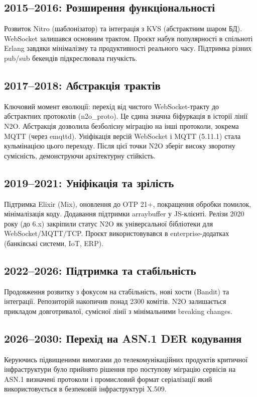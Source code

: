 \documentclass{article}
\begin{document}
\subsection{2015--2016: Розширення функціональності}
Розвиток Nitro (шаблонізатор) та інтеграція з KVS (абстрактним шаром БД). WebSocket
залишався основним трактом. Проєкт набув популярності в спільноті Erlang завдяки мінімалізму
та продуктивності реального часу. Підтримка різних pub/sub бекендів підкреслювала гнучкість.

\subsection{2017--2018: Абстракція трактів}
Ключовий момент еволюції: перехід від чистого WebSocket-тракту до абстрактних протоколів (n2o\_proto).
Це єдина значна біфуркація в історії лінії N2O. Абстракція дозволила безболісну міграцію на інші протоколи,
зокрема MQTT (через emqttd). Уніфікація версій WebSocket і MQTT (5.11.1) стала кульмінацією цього переходу.
Після цієї точки N2O зберіг високу зворотну сумісність, демонструючи архітектурну стійкість.

\subsection{2019--2021: Уніфікація та зрілість}
Підтримка Elixir (Mix), оновлення до OTP 21+, покращення обробки помилок, мінімалізація коду.
Додавання підтримки arraybuffer у JS-клієнті. Релізи 2020 року (до 6.x) закріпили статус N2O
як універсальної бібліотеки для WebSocket/MQTT/TCP. Проєкт використовувався в
enterprise-додатках (банківські системи, IoT, ERP).

\subsection{2022--2026: Підтримка та стабільність}
Продовження розвитку з фокусом на стабільність, нові хости (Bandit) та інтеграції.
Репозиторій накопичив понад 2300 комітів. N2O залишається прикладом довготривалої,
сумісної лінії з мінімальними breaking changes.

\subsection{2026--2030: Перехід на ASN.1 DER кодування}
Керуючись підвищеними вимогами до телекомунікаційних продуктів критичної інфраструктури
було прийнято рішення про поступову міграцію сервісів на ASN.1 визначені протоколи і
промисловий формат серіалізації який використовується в безпековій інфраструктурі X.509.
\end{document}
